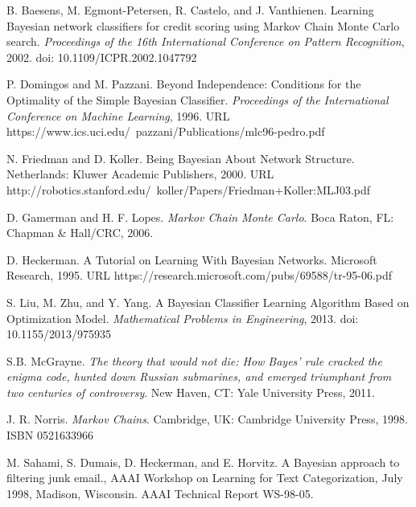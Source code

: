 \documentclass[12pt,twoside]{reedthesis}
\begin{document}
\newpage
\begin{thebibliography}{1}

 B. Baesens, M. Egmont-Petersen, R. Castelo, and J. Vanthienen. Learning Bayesian network classifiers for credit scoring using Markov Chain Monte Carlo search. {\em Proceedings of the 16th International Conference on Pattern Recognition}, 2002. doi: 10.1109/ICPR.2002.1047792

 P. Domingos and M. Pazzani. Beyond Independence: Conditions for the Optimality of the Simple Bayesian Classifier. {\em Proceedings of the International Conference on Machine Learning}, 1996. URL https://www.ics.uci.edu/~pazzani/Publications/mlc96-pedro.pdf

 N. Friedman and D. Koller. Being Bayesian About Network Structure. Netherlands: Kluwer Academic Publishers, 2000. URL http://robotics.stanford.edu/~koller/Papers/Friedman+Koller:MLJ03.pdf

 D. Gamerman and H. F. Lopes. {\em Markov Chain Monte Carlo}. Boca Raton, FL: Chapman \& Hall/CRC, 2006.

 D. Heckerman. A Tutorial on Learning With Bayesian Networks. Microsoft Research, 1995. URL https://research.microsoft.com/pubs/69588/tr-95-06.pdf

 S. Liu, M. Zhu, and Y. Yang. A Bayesian Classifier Learning Algorithm Based on Optimization Model. {\em Mathematical Problems in Engineering}, 2013. doi: 10.1155/2013/975935 %

 S.B. McGrayne. {\em The theory that would not die: How Bayes' rule cracked the enigma code, hunted down Russian submarines, and emerged triumphant from two centuries of controversy}. New Haven, CT: Yale University Press, 2011.

 J. R. Norris. {\em Markov Chains}. Cambridge, UK: Cambridge University Press, 1998. ISBN 0521633966

 M. Sahami, S. Dumais, D. Heckerman, and E. Horvitz. A Bayesian approach to filtering junk email., AAAI Workshop on Learning for Text Categorization, July 1998, Madison, Wisconsin. AAAI Technical Report WS-98-05.

\end{thebibliography}


%  

\end{document}
